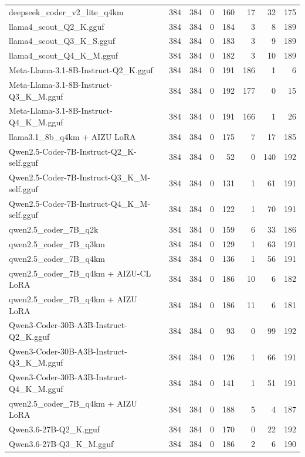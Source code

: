 \begin{table}[htbp]
{\begin{tabular}{lrrrrrrr}
    deepseek\_coder\_v2\_lite\_q4km & 384 & 384 & 0 & 160 & 17 & 32 & 175 \\
    llama4\_scout\_Q2\_K.gguf & 384 & 384 & 0 & 184 & 3 & 8 & 189 \\
    llama4\_scout\_Q3\_K\_S.gguf & 384 & 384 & 0 & 183 & 3 & 9 & 189 \\
    llama4\_scout\_Q4\_K\_M.gguf & 384 & 384 & 0 & 182 & 3 & 10 & 189 \\
    Meta-Llama-3.1-8B-Instruct-Q2\_K.gguf & 384 & 384 & 0 & 191 & 186 & 1 & 6 \\
    Meta-Llama-3.1-8B-Instruct-Q3\_K\_M.gguf & 384 & 384 & 0 & 192 & 177 & 0 & 15 \\
    Meta-Llama-3.1-8B-Instruct-Q4\_K\_M.gguf & 384 & 384 & 0 & 191 & 166 & 1 & 26 \\
    llama3.1\_8b\_q4km + AIZU LoRA & 384 & 384 & 0 & 175 & 7 & 17 & 185 \\
    Qwen2.5-Coder-7B-Instruct-Q2\_K-self.gguf & 384 & 384 & 0 & 52 & 0 & 140 & 192 \\
    Qwen2.5-Coder-7B-Instruct-Q3\_K\_M-self.gguf & 384 & 384 & 0 & 131 & 1 & 61 & 191 \\
    Qwen2.5-Coder-7B-Instruct-Q4\_K\_M-self.gguf & 384 & 384 & 0 & 122 & 1 & 70 & 191 \\
    qwen2.5\_coder\_7B\_q2k & 384 & 384 & 0 & 159 & 6 & 33 & 186 \\
    qwen2.5\_coder\_7B\_q3km & 384 & 384 & 0 & 129 & 1 & 63 & 191 \\
    qwen2.5\_coder\_7B\_q4km & 384 & 384 & 0 & 136 & 1 & 56 & 191 \\
    qwen2.5\_coder\_7B\_q4km + AIZU-CL LoRA & 384 & 384 & 0 & 186 & 10 & 6 & 182 \\
    qwen2.5\_coder\_7B\_q4km + AIZU LoRA & 384 & 384 & 0 & 186 & 11 & 6 & 181 \\
    Qwen3-Coder-30B-A3B-Instruct-Q2\_K.gguf & 384 & 384 & 0 & 93 & 0 & 99 & 192 \\
    Qwen3-Coder-30B-A3B-Instruct-Q3\_K\_M.gguf & 384 & 384 & 0 & 126 & 1 & 66 & 191 \\
    Qwen3-Coder-30B-A3B-Instruct-Q4\_K\_M.gguf & 384 & 384 & 0 & 141 & 1 & 51 & 191 \\
    qwen2.5\_coder\_7B\_q4km + AIZU LoRA & 384 & 384 & 0 & 188 & 5 & 4 & 187 \\
    Qwen3.6-27B-Q2\_K.gguf & 384 & 384 & 0 & 170 & 0 & 22 & 192 \\
    Qwen3.6-27B-Q3\_K\_M.gguf & 384 & 384 & 0 & 186 & 2 & 6 & 190 \\

\end{tabular}}
\end{table}
